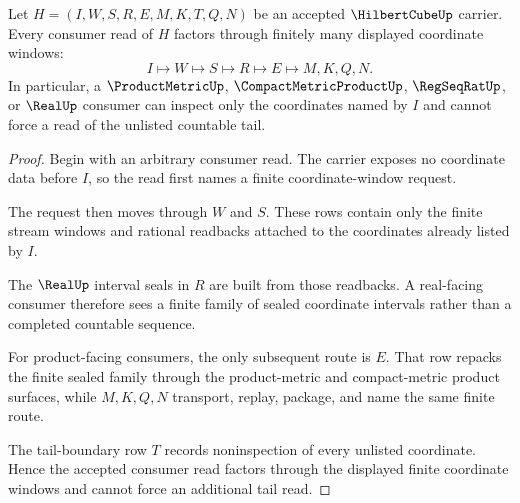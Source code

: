 \begin{theorem}
\label{thm:hilbert-cube-finite-coordinate-projection}
Let $H=(I,W,S,R,E,M,K,T,Q,N)$ be an accepted $\HilbertCubeUp$ carrier. Every consumer read of $H$ factors through finitely many displayed coordinate windows:
$$
I \longmapsto W \longmapsto S \longmapsto R \longmapsto E \longmapsto M,K,Q,N .
$$
In particular, a $\ProductMetricUp$, $\CompactMetricProductUp$, $\RegSeqRatUp$, or $\RealUp$ consumer can inspect only the coordinates named by $I$ and cannot force a read of the unlisted countable tail.
\end{theorem}
\begin{proof}
Begin with an arbitrary consumer read. The carrier exposes no coordinate data before $I$, so the read first names a finite coordinate-window request.

The request then moves through $W$ and $S$. These rows contain only the finite stream windows and rational readbacks attached to the coordinates already listed by $I$.

The $\RealUp$ interval seals in $R$ are built from those readbacks. A real-facing consumer therefore sees a finite family of sealed coordinate intervals rather than a completed countable sequence.

For product-facing consumers, the only subsequent route is $E$. That row repacks the finite sealed family through the product-metric and compact-metric product surfaces, while $M,K,Q,N$ transport, replay, package, and name the same finite route.

The tail-boundary row $T$ records noninspection of every unlisted coordinate. Hence the accepted consumer read factors through the displayed finite coordinate windows and cannot force an additional tail read.
\end{proof}

